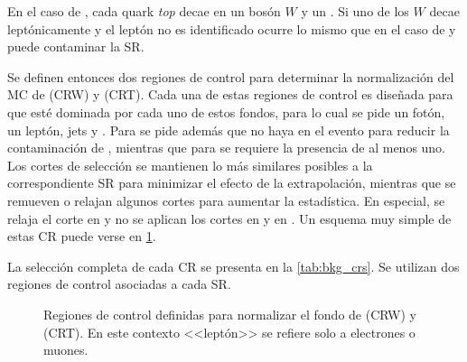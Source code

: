 En el caso de {\ttgam}, cada quark \emph{top} decae en un bosón $W$ y un
{\bjet}. Si uno de los $W$ decae leptónicamente y el leptón no es identificado
ocurre lo mismo que en el caso de {\wgam} y puede contaminar la SR.

Se definen entonces dos regiones de control para determinar la normalización del
MC de {\wgam} (CRW) y {\ttgam} (CRT). Cada una de estas regiones de control es
diseñada para que esté dominada por cada uno de estos fondos, para lo cual se
pide un fotón, un leptón, jets y \met. Para {\CRW} se pide además que no haya
{\bjets} en el evento para reducir la contaminación de {\ttgam}, mientras que
para {\CRT} se requiere la presencia de al menos uno.
Los cortes de selección se mantienen lo
más similares posibles a la correspondiente SR para minimizar el efecto de la
extrapolación, mientras que se remueven o relajan
algunos cortes para aumentar la estadística. En especial, se relaja el corte en
{\met} y no se aplican los cortes en {\HT} y en {\rt}. Un esquema muy simple de
estas CR puede verse en \cref{fig:bkg_crt_crw}.

La selección completa de cada CR se presenta en la \cref{tab:bkg_crs}. Se utilizan
dos regiones de control asociadas a cada SR.

\begin{figure}[!htbp]
  \centering

  \resizebox{0.5\textwidth}{!}{}

  \caption{Regiones de control definidas para normalizar el fondo de {\wgam} (CRW) y {\ttgam} (CRT). En este contexto <<leptón>> se refiere solo a electrones o muones.}
  \label{fig:bkg_crt_crw}
\end{figure}




